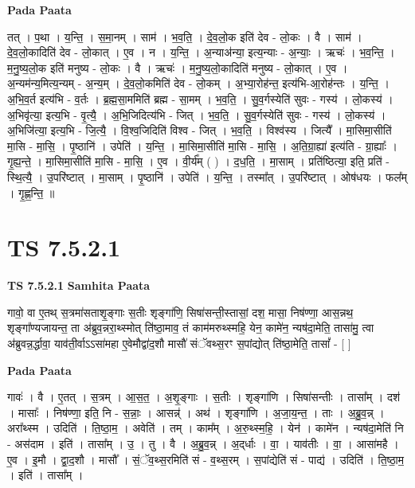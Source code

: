 \documentclass[17pt]{extarticle}
\begin{document}
\textbf{Pada Paata} \newline

तत् । प॒था । य॒न्ति॒ । स॒मा॒नम् । साम॑ । भ॒व॒ति॒ । दे॒व॒लो॒क इति॑ देव - लो॒कः । वै । साम॑ । दे॒व॒लो॒कादिति॑ देव - लो॒कात् । ए॒व । न । य॒न्ति॒ । अ॒न्या‌अ॑न्या॒ इत्य॒न्याः - अ॒न्याः॒ । ऋचः॑ । भ॒व॒न्ति॒ । म॒नु॒ष्य॒लो॒क इति॑ मनुष्य - लो॒कः । वै । ऋचः॑ । म॒नु॒ष्य॒लो॒कादिति॑ मनुष्य - लो॒कात् । ए॒व । अ॒न्यम॑न्य॒मित्य॒न्यम् - अ॒न्य॒म् । दे॒व॒लो॒कमिति॑ देव - लो॒कम् । अ॒भ्या॒रोह॑न्त॒ इत्य॑भि-आ॒रोह॑न्तः । य॒न्ति॒ । अ॒भि॒व॒र्त इत्य॑भि  -  व॒र्तः । ब्र॒ह्म॒सा॒ममिति॑ ब्रह्म - सा॒मम् । भ॒व॒ति॒ । सु॒व॒र्गस्येति॑ सुवः - गस्य॑ । लो॒कस्य॑ । अ॒भिवृ॑त्या॒ इत्य॒भि - वृ॒त्यै॒ । अ॒भि॒जिदित्य॑भि - जित् । भ॒व॒ति॒ । सु॒व॒र्गस्येति॑ सुवः - गस्य॑ । लो॒कस्य॑ । अ॒भिजि॑त्या॒ इत्य॒भि - जि॒त्यै॒ । वि॒श्व॒जिदिति॑ विश्व - जित् । भ॒व॒ति॒ । विश्व॑स्य । जित्यै᳚ । मा॒सिमा॒सीति॑ मा॒सि - मा॒सि॒ । पृ॒ष्ठानि॑ । उपेति॑ । य॒न्ति॒ । मा॒सिमा॒सीति॑ मा॒सि - मा॒सि॒ । अ॒ति॒ग्रा॒ह्या॑ इत्य॑ति - ग्रा॒ह्याः᳚ । गृ॒ह्य॒न्ते॒ । मा॒सिमा॒सीति॑ मा॒सि - मा॒सि॒ । ए॒व । वी॒र्य᳚म् ( ) । द॒ध॒ति॒ । मा॒साम् । प्रति॑ष्ठित्या॒ इति॒ प्रति॑ - स्थि॒त्यै॒ । उ॒परि॑ष्टात् । मा॒साम् । पृ॒ष्ठानि॑ । उपेति॑ । य॒न्ति॒ । तस्मा᳚त् । उ॒परि॑ष्टात् । ओष॑धयः । फल᳚म् । गृ॒ह्ण॒न्ति॒ ॥  \newline





\section{ TS 7.5.2.1 }

\textbf{TS 7.5.2.1 } \newline
\textbf{Samhita Paata} \newline

गावो॒ वा ए॒तथ् स॒त्रमा॑सताशृ॒ङ्गाः स॒तीः शृङ्गा॑णि॒ सिषा॑सन्ती॒स्तासां॒ दश॒ मासा॒ निष॑ण्णा॒ आस॒न्नथ॒ शृङ्गा᳚ण्यजायन्त॒ ता अ॑ब्रुव॒न्नरा॒थ्स्मोत् ति॑ष्ठा॒माव॒ तं काम॑मरुथ्स्महि॒ येन॒ कामे॑न॒ न्यष॑दा॒मेति॒ तासा॑मु॒ त्वा अ॑ब्रुवन्न॒र्द्धावा॒ याव॑ती॒र्वाऽऽसा॑महा ए॒वेमौद्वा॑द॒शौ मासौ॑ संॅवथ्स॒रꣳ स॒पांद्योत् ति॑ष्ठा॒मेति॒ तासां᳚ - [  ] \newline

\textbf{Pada Paata} \newline

गावः॑ । वै । ए॒तत् । स॒त्रम् । आ॒स॒त॒ । अ॒शृ॒ङ्गाः । स॒तीः । शृङ्गा॑णि । सिषा॑सन्तीः । तासा᳚म् । दश॑ । मासाः᳚ । निष॑ण्णा॒ इति॒ नि - स॒न्नाः॒ । आसन्न्॑ । अथ॑ । शृङ्गा॑णि । अ॒जा॒य॒न्त॒ । ताः । अ॒ब्रु॒व॒न्न् । अरा᳚थ्स्म । उदिति॑ । ति॒ष्ठा॒म॒ । अवेति॑ । तम् । काम᳚म् । अ॒रु॒थ्स्म॒हि॒ । येन॑ । कामे॑न । न्यष॑दा॒मेति॑ नि - अस॑दाम । इति॑ । तासा᳚म् । उ॒ । तु । वै । अ॒ब्रु॒व॒न्न् । अ॒द्‌र्धाः । वा॒ । याव॑तीः । वा॒ । आसा॑महै । ए॒व । इ॒मौ । द्वा॒द॒शौ । मासौ᳚ । सं॒ॅव॒थ्स॒रमिति॑ सं - व॒थ्स॒रम् । स॒पांद्येति॑ सं - पाद्य॑ । उदिति॑ । ति॒ष्ठा॒म॒ । इति॑ । तासा᳚म् ।  \newline
\end{document}
